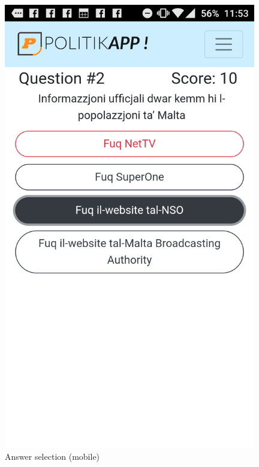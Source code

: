 \documentclass[paper=a4,fontsize=11pt]{article}
\begin{document}
\begin{figure}[H]
  \caption{Answer selection (mobile)}
	\hfill\includegraphics[width=11cm]{Walkthrough/Mobile_selection.PNG}\hspace*{\fill}
\end{figure}

\end{document}
